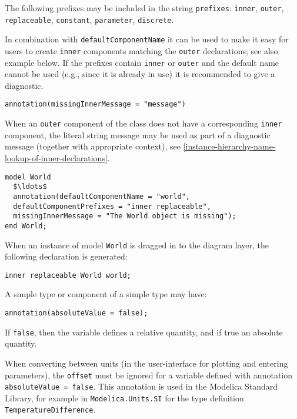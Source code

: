 The following prefixes may be included in the string \lstinline!prefixes!: \lstinline!inner!,
\lstinline!outer!, \lstinline!replaceable!, \lstinline!constant!, \lstinline!parameter!, \lstinline!discrete!.

\begin{nonnormative}
In combination with \lstinline!defaultComponentName! it can be used to make it easy for users to create \lstinline!inner! components
matching the \lstinline!outer! declarations; see also example below.  If the prefixes contain \lstinline!inner! or \lstinline!outer!
and the default name cannot be used (e.g., since it is already in use) it is recommended to give a diagnostic.
\end{nonnormative}

\begin{lstlisting}[language=modelica]
annotation(missingInnerMessage = "message")
\end{lstlisting}%

When an \lstinline!outer! component of the class does not have a corresponding \lstinline!inner!
component, the literal string message may be used as part of a diagnostic message (together with appropriate context), see
\cref{instance-hierarchy-name-lookup-of-inner-declarations}.

\begin{example}
\begin{lstlisting}[language=modelica]
model World
  $\ldots$
  annotation(defaultComponentName = "world",
  defaultComponentPrefixes = "inner replaceable",
  missingInnerMessage = "The World object is missing");
end World;
\end{lstlisting}
When an instance of model \lstinline!World! is dragged in to the diagram layer, the
following declaration is generated:
\begin{lstlisting}[language=modelica]
inner replaceable World world;
\end{lstlisting}
\end{example}

A simple type or component of a simple type may have:
\begin{lstlisting}[language=modelica]
annotation(absoluteValue = false);
\end{lstlisting}%

If \lstinline!false!, then the variable defines a relative quantity, and if true an absolute quantity.

\begin{nonnormative}
When converting between units (in the user-interface for plotting and entering parameters), the \lstinline!offset! must be
ignored for a variable defined with annotation \lstinline!absoluteValue = false!.
This annotation is used in the Modelica Standard Library, for example in
\lstinline!Modelica.Units.SI! for the type definition \lstinline!TemperatureDifference!.
\end{nonnormative}

